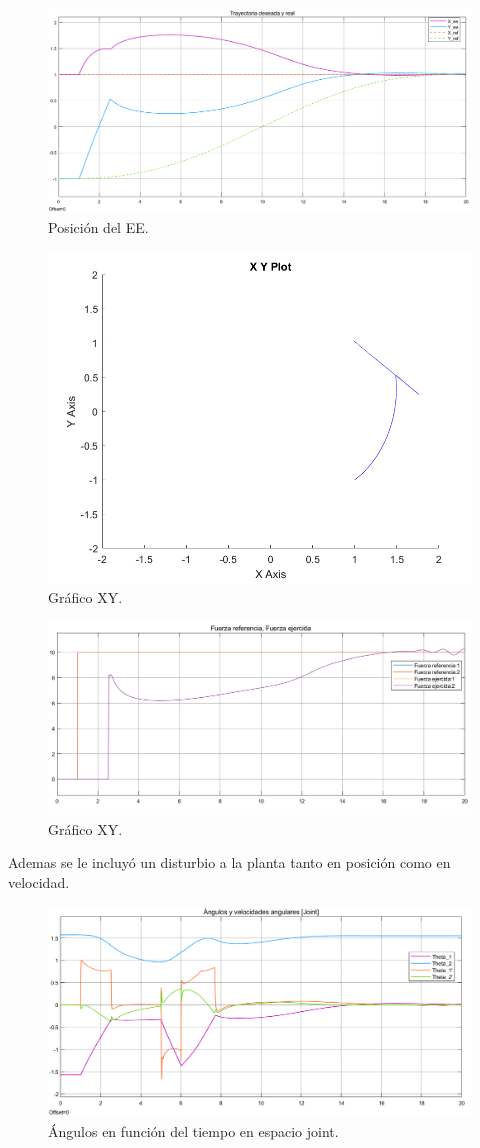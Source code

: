 \begin{figure}[H]
	\centering
	\includegraphics[width=0.8\linewidth]{ImagenesControl híbrido no lineal/3_3_b}
	\caption{Posici\'on  del EE.}	
	\label{fig:cpos}
\end{figure}
\begin{figure}[H]
	\centering
	\includegraphics[width=0.5\linewidth]{ImagenesControl híbrido no lineal/3_3_c}
	\caption{Gr\'afico XY.}	
	\label{fig:cxy}
\end{figure}
\begin{figure}[H]
	\centering
	\includegraphics[width=0.8\linewidth]{ImagenesControl híbrido no lineal/3_3_e}
	\caption{Gr\'afico XY.}	
	\label{fig:cf}
\end{figure}
Ademas se le incluy\'o un disturbio a la planta tanto en posici\'on como en velocidad.
\begin{figure}[H]
	\centering
	\includegraphics[width=0.8\linewidth]{ImagenesControl híbrido no lineal/3_3_f_a}
	\caption{\'Angulos en funci\'on del tiempo en espacio joint.}	
	\label{fig:cthetasd}
\end{figure}


